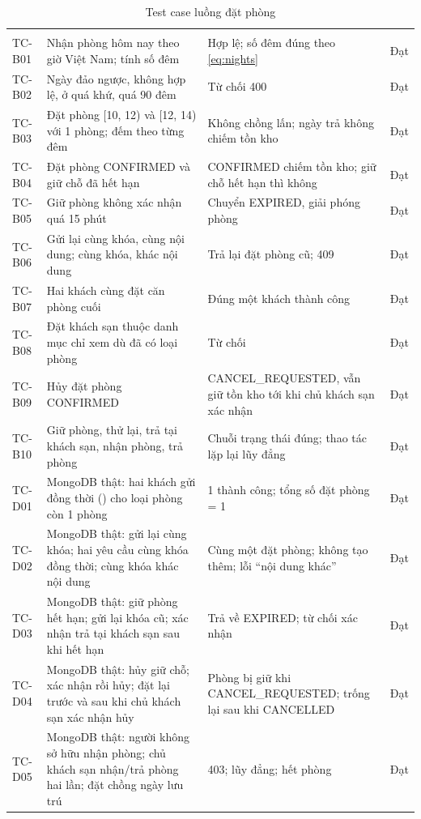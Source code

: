 \begin{rtable}
\begin{longtable}{|C{1.4cm}|L{6.6cm}|L{5.0cm}|C{1.6cm}|}
\caption{Test case luồng đặt phòng}\label{tab:test-booking}\\
\hline
{} &  &  &  \\ \hline
\endfirsthead
\hline
{} &  &  &  \\ \hline
\endhead
TC-B01 & Nhận phòng hôm nay theo giờ Việt Nam; tính số đêm & Hợp lệ; số đêm đúng theo \cref{eq:nights} & Đạt \\ \hline
TC-B02 & Ngày đảo ngược, không hợp lệ, ở quá khứ, quá 90 đêm & Từ chối 400 & Đạt \\ \hline
TC-B03 & Đặt phòng [10, 12) và [12, 14) với 1 phòng; đếm theo từng đêm & Không chồng lấn; ngày trả không chiếm tồn kho & Đạt \\ \hline
TC-B04 & Đặt phòng CONFIRMED và giữ chỗ đã hết hạn & CONFIRMED chiếm tồn kho; giữ chỗ hết hạn thì không & Đạt \\ \hline
TC-B05 & Giữ phòng không xác nhận quá 15 phút & Chuyển EXPIRED, giải phóng phòng & Đạt \\ \hline
TC-B06 & Gửi lại cùng khóa, cùng nội dung; cùng khóa, khác nội dung & Trả lại đặt phòng cũ; 409 & Đạt \\ \hline
TC-B07 & Hai khách cùng đặt căn phòng cuối & Đúng một khách thành công & Đạt \\ \hline
TC-B08 & Đặt khách sạn thuộc danh mục chỉ xem dù đã có loại phòng & Từ chối & Đạt \\ \hline
TC-B09 & Hủy đặt phòng CONFIRMED & CANCEL\_REQUESTED, vẫn giữ tồn kho tới khi chủ khách sạn xác nhận & Đạt \\ \hline
TC-B10 & Giữ phòng, thử lại, trả tại khách sạn, nhận phòng, trả phòng & Chuỗi trạng thái đúng; thao tác lặp lại lũy đẳng & Đạt \\ \hline
TC-D01 & MongoDB thật: hai khách gửi đồng thời () cho loại phòng còn 1 phòng & 1 thành công; tổng số đặt phòng = 1 & Đạt \\ \hline
TC-D02 & MongoDB thật: gửi lại cùng khóa; hai yêu cầu cùng khóa đồng thời; cùng khóa khác nội dung & Cùng một đặt phòng; không tạo thêm; lỗi ``nội dung khác'' & Đạt \\ \hline
TC-D03 & MongoDB thật: giữ phòng hết hạn; gửi lại khóa cũ; xác nhận trả tại khách sạn sau khi hết hạn & Trả về EXPIRED; từ chối xác nhận & Đạt \\ \hline
TC-D04 & MongoDB thật: hủy giữ chỗ; xác nhận rồi hủy; đặt lại trước và sau khi chủ khách sạn xác nhận hủy & Phòng bị giữ khi CANCEL\_REQUESTED; trống lại sau khi CANCELLED & Đạt \\ \hline
TC-D05 & MongoDB thật: người không sở hữu nhận phòng; chủ khách sạn nhận/trả phòng hai lần; đặt chồng ngày lưu trú & 403; lũy đẳng; hết phòng & Đạt \\ \hline
\end{longtable}
\end{rtable}

